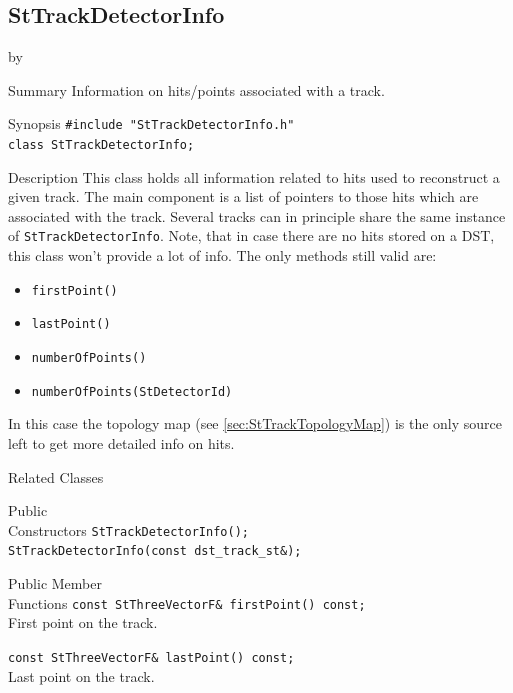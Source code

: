 \documentclass[twoside]{article}
\newcommand{\entrylabel}[1]{\mbox{\textbf{{#1}}}\hfil}%
\newenvironment{entry}
{\begin{list}{}%
    {\renewcommand{\makelabel}{\entrylabel}%
     \setlength{\labelwidth}{90pt}%
     \setlength{\leftmargin}{\labelwidth}
     \advance\leftmargin by \labelsep%
      }%
    }%
  {\end{list}}
\newcommand{\Entrylabel}[1]%
{\raisebox{0pt}[1ex][0pt]{\makebox[\labelwidth][l]%
    {\parbox[t]{\labelwidth}{\hspace{0pt}\textbf{{#1}}}}}}
\newenvironment{Entry}%
{\renewcommand{\entrylabel}{\Entrylabel}\begin{entry}}%
  {\end{entry}}
\begin{document}
\subsection{StTrackDetectorInfo}
\label{sec:StTrackDetectorInfo}
\begin{Entry}
\item[Summary] Information on hits/points associated with a track.
    
\item[Synopsis]
    \verb+#include "StTrackDetectorInfo.h"+\\
    \verb+class StTrackDetectorInfo;+\\
\item[Description] This class holds all information related to hits
    used to reconstruct a given track. The main component is a list of
    pointers to those hits which are associated with the track.
    Several tracks can in principle share the same instance of
    \texttt{StTrackDetectorInfo}.  Note, that in case there are no
    hits stored on a DST, this class won't provide a lot of info.
    The only methods still valid are:
    \begin{itemize}
    \item \texttt{firstPoint()}
    \item \texttt{lastPoint()}
    \item \texttt{numberOfPoints()}
    \item \texttt{numberOfPoints(StDetectorId)}
    \end{itemize}
    In this case the topology map (see \ref{sec:StTrackTopologyMap})
    is the only source left to get more detailed info on hits.
    
    
\item[Related Classes]
\item[Public\\ Constructors]
    \verb+StTrackDetectorInfo();+\\
    \verb+StTrackDetectorInfo(const dst_track_st&);+\\
    
\item[Public Member\\ Functions]
    \verb+const StThreeVectorF& firstPoint() const;+\\
    First point on the track.
    
    \verb+const StThreeVectorF& lastPoint() const;+\\
    Last point on the track.
    

\end{Entry}
\end{document}
